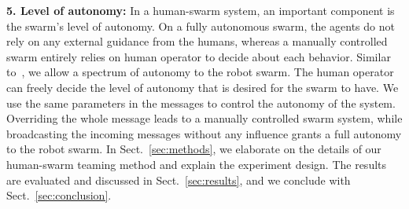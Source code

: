 \documentclass[runningheads]{llncs}%
\begin{document}
\textbf{5. Level of autonomy:}
In a human-swarm system, an important component is the swarm's {level of autonomy}. On a fully autonomous swarm, the agents do not rely on any external guidance from the humans, whereas a manually controlled swarm entirely relies on human operator to decide about each behavior. Similar to~\cite{walker2013levels,coppin2011autonomy,nam2019models}, we allow a spectrum of autonomy to the robot swarm. The human operator can freely decide the level of autonomy that is desired for the swarm to have. We use the same parameters in the messages to control the autonomy of the system. Overriding the whole message leads to a manually controlled swarm system, while broadcasting the incoming messages without any influence grants a full autonomy to the robot swarm.
In Sect.~\ref{sec:methods}, we elaborate on the details of our human-swarm teaming method and explain the experiment design. The results are evaluated and discussed in Sect.~\ref{sec:results}, and we conclude with Sect.~\ref{sec:conclusion}. 
\end{document}

